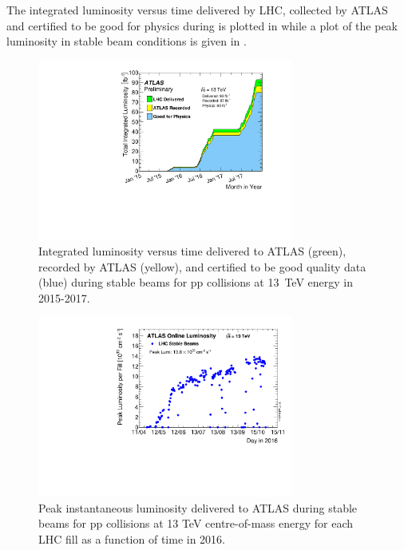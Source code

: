 The integrated luminosity versus time delivered by LHC, collected by ATLAS and certified to be good for physics during \RunTwo is plotted in \Fig{\ref{fig:lumi}} while a plot of the peak luminosity in stable beam conditions is given in \Fig{\ref{fig:peakLumiByFill}}.
\begin{figure}[tp]
	\centering
	\includegraphics[width=0.75\textwidth]{LHC_ATLAS/intlumivstimeRun2DQ.pdf}
	\caption{Integrated luminosity versus time delivered to ATLAS (green), recorded by ATLAS (yellow), and certified to be good quality data (blue) during stable beams for pp collisions at \SI{13}{TeV} \cm energy in 2015-2017.}
	\label{fig:lumi}
\end{figure}
\begin{figure}[tp]
	\centering
	\includegraphics[width=0.75\textwidth]{LHC_ATLAS/peakLumiByFill}
	\caption{Peak instantaneous luminosity delivered to ATLAS during stable beams for pp collisions at 13 TeV centre-of-mass energy for each LHC fill as a function of time in 2016.}
	\label{fig:peakLumiByFill}
\end{figure}

